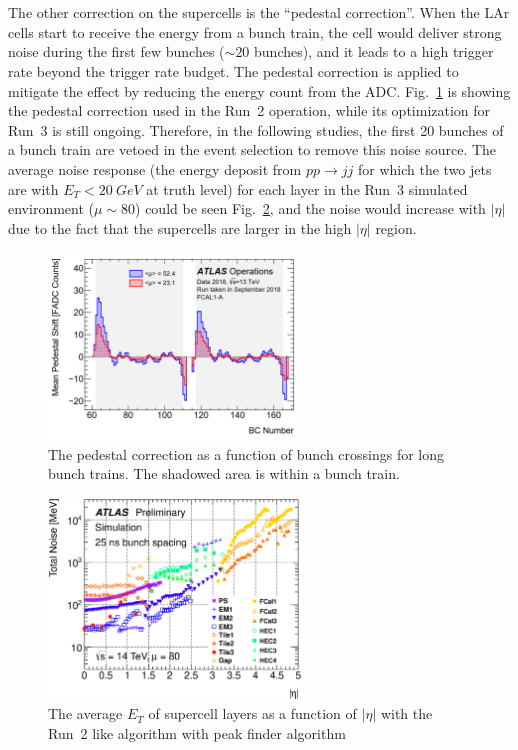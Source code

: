 \noindent
\\
\\The other correction on the supercells is the ``pedestal correction''. When the LAr cells start to receive the energy from a bunch train, the cell would deliver strong noise during the first few bunches ($\sim 20$ bunches), and it leads to a high trigger rate beyond the trigger rate budget. The pedestal correction is applied to mitigate the effect by reducing the energy count from the ADC. Fig.~\ref{Fig:pc} is showing the pedestal correction used in the Run~2 operation, while its optimization for Run~3 is still ongoing. Therefore, in the following studies, the first 20 bunches of a bunch train are vetoed in the event selection to remove this noise source. The average noise response (the energy deposit from $pp\to jj$ for which the two jets are with $E_{T}<20~GeV$ at truth level) for each layer in the Run~3 simulated environment ($\mu\sim80$) could be seen Fig.~\ref{Fig:sc_noise}, and the noise would increase with $|\eta|$ due to the fact that the supercells are larger in the high $|\eta|$ region.
\begin{figure}[!h]                
  	\includegraphics[width=0.6\textwidth]{Chapter6/pedestalCorr.png}
  	\begin{center}
  		\caption{The pedestal correction as a function of bunch crossings for long bunch trains. The shadowed area is within a bunch train\cite{Jongmanns:2661780}.}
  		\label{Fig:pc}            
  	\end{center}
\end{figure}
\begin{figure}[!h]                
	\includegraphics[width=0.6\textwidth]{Chapter6/noise_tot_plot_OFLCOND-MC12-HPS-19-60-25.eps}
	\caption{The average $E_{T}$ of supercell layers as a function of $|\eta|$ with the Run~2 like algorithm with peak finder algorithm\cite{Aleksa:1602230}}
	\label{Fig:sc_noise}            
\end{figure}
